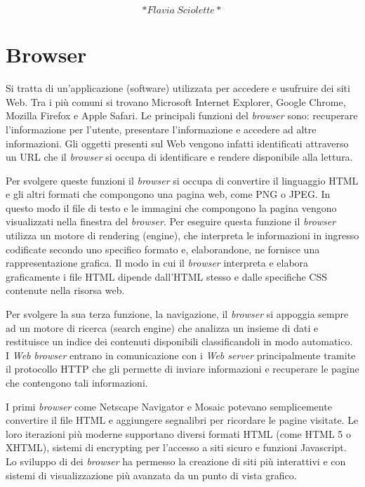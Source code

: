 \documentclass[
  b5paper,
  twoside,
  12pt,
  chapterprefix=false,
  bibliography=totocnumbered,
  parskip=false]{scrbook}
\begin{document}
\[*Flavia~Sciolette*\]

\hypertarget{browser}{%
\chapter{Browser}\label{browser}}

Si tratta di un'applicazione (software) utilizzata per accedere e
usufruire dei siti Web. Tra i più comuni si trovano Microsoft Internet
Explorer, Google Chrome, Mozilla Firefox e Apple Safari. Le principali
funzioni del \emph{browser} sono: recuperare l'informazione per l'utente,
presentare l'informazione e accedere ad altre informazioni. Gli oggetti
presenti sul Web vengono infatti identificati attraverso un URL che il
\emph{browser} si occupa di identificare e rendere disponibile alla lettura.

Per svolgere queste funzioni il \emph{browser} si occupa di convertire il
linguaggio HTML e gli altri formati che compongono una pagina web, come
PNG o JPEG. In questo modo il file di testo e le immagini che compongono
la pagina vengono visualizzati nella finestra del \emph{browser}. Per
eseguire questa funzione il \emph{browser} utilizza un motore di rendering
(engine), che interpreta le informazioni in ingresso codificate secondo
uno specifico formato e, elaborandone, ne fornisce una rappresentazione
grafica. Il modo in cui il \emph{browser} interpreta e elabora graficamente i
file HTML dipende dall'HTML stesso e dalle specifiche CSS contenute
nella risorsa web.

Per svolgere la sua terza funzione, la navigazione, il \emph{browser} si
appoggia sempre ad un motore di ricerca (search engine) che analizza un
insieme di dati e restituisce un indice dei contenuti disponibili
classificandoli in modo automatico. I \emph{Web} \emph{browser} entrano in
comunicazione con i \emph{Web server} principalmente tramite il protocollo
HTTP che gli permette di inviare informazioni e recuperare le pagine che
contengono tali informazioni.

I primi \emph{browser} come Netscape Navigator e Mosaic potevano
semplicemente convertire il file HTML e aggiungere segnalibri per
ricordare le pagine visitate. Le loro iterazioni più moderne supportano
diversi formati HTML (come HTML 5 o XHTML), sistemi di encrypting per
l'accesso a siti sicuro e funzioni Javascript. Lo sviluppo di dei
\emph{browser} ha permesso la creazione di siti più interattivi e con sistemi
di visualizzazione più avanzata da un punto di vista grafico.
\end{document}
